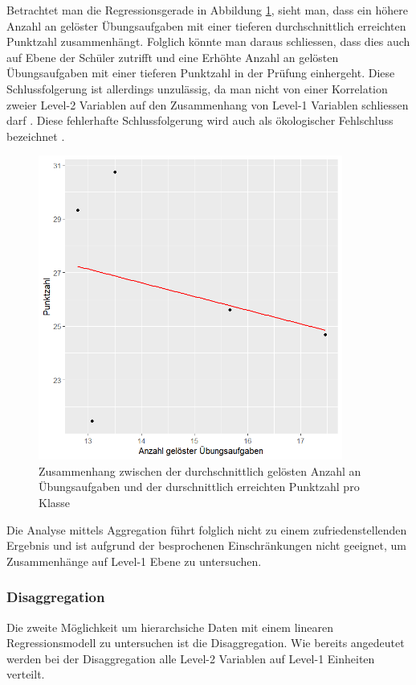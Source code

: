\documentclass[12pt]{article}\usepackage[]{graphicx}\usepackage[]{color}
\numberwithin{equation}{section}
\begin{document}
Betrachtet man die Regressionsgerade in Abbildung \ref{fig:aggregiert}, sieht man, dass ein höhere Anzahl an gelöster Übungsaufgaben mit einer tieferen durchschnittlich erreichten Punktzahl zusammenhängt. Folglich könnte man daraus schliessen, dass dies auch auf Ebene der Schüler zutrifft und eine Erhöhte Anzahl an gelösten Übungsaufgaben mit einer tieferen Punktzahl in der Prüfung einhergeht. Diese Schlussfolgerung ist allerdings unzulässig, da man nicht von einer Korrelation zweier Level-2 Variablen auf den Zusammenhang von Level-1 Variablen schliessen darf \citep{SnijdersTomA.B2012Ma:a}.  Diese fehlerhafte Schlussfolgerung wird auch als ökologischer Fehlschluss bezeichnet \citep{robinson2009ecological}.

\begin{figure}[b!]
\centering
\includegraphics[width = 10cm, height = 10cm]{aggregation}
\caption{Zusammenhang zwischen der durchschnittlich gelösten Anzahl an Übungsaufgaben und der durschnittlich erreichten Punktzahl pro Klasse}
\label{fig:aggregiert}
\end{figure}

Die Analyse mittels Aggregation führt folglich nicht zu einem zufriedenstellenden Ergebnis und ist aufgrund der besprochenen Einschränkungen nicht geeignet, um Zusammenhänge auf Level-1 Ebene zu untersuchen.

\subsubsection{Disaggregation} \label{section:disaggregation}
Die zweite Möglichkeit um hierarchsiche Daten mit einem linearen Regressionsmodell zu untersuchen ist die Disaggregation. Wie bereits angedeutet werden bei der Disaggregation alle Level-2 Variablen auf Level-1 Einheiten verteilt. 
\end{document}
